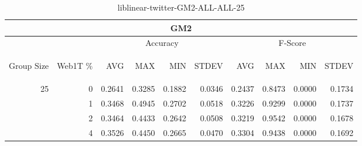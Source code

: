 \begin{center}
\begin{table}[htbp]
\begin{tabular}{ | r | r | r | r | r | r | r | r | r | r |}
\hline
\multicolumn{10}{|c|}{GM2}\\
\hline
 & & \multicolumn{4}{|c|}{Accuracy} & \multicolumn{4}{|c|}{F-Score}\\ \cline{3-10}
\begin{sideways}Group Size\end{sideways} & \begin{sideways}Web1T \%\end{sideways} & \begin{sideways}AVG\end{sideways} & \begin{sideways}MAX\end{sideways} & \begin{sideways}MIN\end{sideways} & \begin{sideways}STDEV\end{sideways} & \begin{sideways}AVG\end{sideways} & \begin{sideways}MAX\end{sideways} & \begin{sideways}MIN\end{sideways} & \begin{sideways}STDEV\end{sideways}\\
\hline
\multirow{3}{*}{25}
 & 0 & 0.2641 & 0.3285 & 0.1882 & 0.0346 & 0.2437 & 0.8473 & 0.0000 & 0.1734\\ \cline{2-10}
 & 1 & 0.3468 & 0.4945 & 0.2702 & 0.0518 & 0.3226 & 0.9299 & 0.0000 & 0.1737\\ \cline{2-10}
 & 2 & 0.3464 & 0.4433 & 0.2642 & 0.0508 & 0.3219 & 0.9542 & 0.0000 & 0.1678\\ \cline{2-10}
 & 4 & 0.3526 & 0.4450 & 0.2665 & 0.0470 & 0.3304 & 0.9438 & 0.0000 & 0.1692\\ \cline{2-10}
\hline
\end{tabular}
\caption{liblinear-twitter-GM2-ALL-ALL-25}
\label{table:liblinear-twitter-GM2-ALL-ALL-25}
\end{table}
\end{center}

